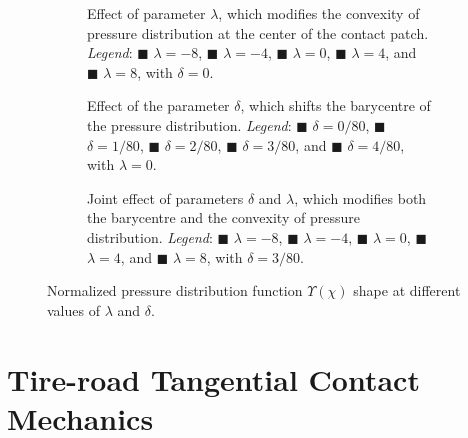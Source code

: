 \begin{figure}
  \centering
  \begin{subfigure}[c]{0.3\textwidth}
    \centering
    \caption{Effect of parameter $\lambda$, which modifies the convexity of pressure distribution at the center of the contact patch. \emph{Legend}: \textcolor{mycolor1}{$\blacksquare$} $\lambda = -8$, \textcolor{mycolor2}{$\blacksquare$} $\lambda = -4$, \textcolor{mycolor3}{$\blacksquare$} $\lambda = 0$, \textcolor{mycolor4}{$\blacksquare$} $\lambda = 4$, and \textcolor{mycolor5}{$\blacksquare$} $\lambda = 8$, with $\delta = 0$.}
  \end{subfigure}%
  \hfill
  \begin{subfigure}[c]{0.3\textwidth}
    \centering
    \caption{Effect of the parameter $\delta$, which shifts the barycentre of the pressure distribution. \emph{Legend}: \textcolor{mycolor1}{$\blacksquare$} $\delta = 0/80$, \textcolor{mycolor2}{$\blacksquare$} $\delta = 1/80$, \textcolor{mycolor3}{$\blacksquare$} $\delta = 2/80$, \textcolor{mycolor4}{$\blacksquare$} $\delta = 3/80$, and \textcolor{mycolor5}{$\blacksquare$} $\delta = 4/80$, with $\lambda = 0$.}
  \end{subfigure}%
  \hfill
  \begin{subfigure}[c]{0.3\textwidth}
    \centering
    \caption{Joint effect of parameters $\delta$ and $\lambda$, which modifies both the barycentre and the convexity of pressure distribution. \emph{Legend}: \textcolor{mycolor1}{$\blacksquare$} $\lambda = -8$, \textcolor{mycolor2}{$\blacksquare$} $\lambda = -4$, \textcolor{mycolor3}{$\blacksquare$} $\lambda = 0$, \textcolor{mycolor4}{$\blacksquare$} $\lambda = 4$, and \textcolor{mycolor5}{$\blacksquare$} $\lambda = 8$, with $\delta = 3/80$.}
  \end{subfigure}
  \caption{Normalized pressure distribution function $\Upsilon(\chi)$ shape at different values of $\lambda$ and $\delta$.}
  \label{chap4:fig:pressure_distribution}
\end{figure}


\section{Tire-road Tangential Contact Mechanics}
\label{chap4:sec:tangential_contact}

